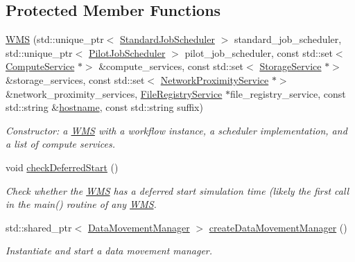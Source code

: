 \subsection*{Protected Member Functions}
\begin{DoxyCompactItemize}
\item 
\hyperlink{classwrench_1_1_w_m_s_a385a87e02d2e6bd7e70624532bca3bdc}{W\+MS} (std\+::unique\+\_\+ptr$<$ \hyperlink{classwrench_1_1_standard_job_scheduler}{Standard\+Job\+Scheduler} $>$ standard\+\_\+job\+\_\+scheduler, std\+::unique\+\_\+ptr$<$ \hyperlink{classwrench_1_1_pilot_job_scheduler}{Pilot\+Job\+Scheduler} $>$ pilot\+\_\+job\+\_\+scheduler, const std\+::set$<$ \hyperlink{classwrench_1_1_compute_service}{Compute\+Service} $\ast$$>$ \&compute\+\_\+services, const std\+::set$<$ \hyperlink{classwrench_1_1_storage_service}{Storage\+Service} $\ast$$>$ \&storage\+\_\+services, const std\+::set$<$ \hyperlink{classwrench_1_1_network_proximity_service}{Network\+Proximity\+Service} $\ast$$>$ \&network\+\_\+proximity\+\_\+services, \hyperlink{classwrench_1_1_file_registry_service}{File\+Registry\+Service} $\ast$file\+\_\+registry\+\_\+service, const std\+::string \&\hyperlink{classwrench_1_1_s4_u___daemon_a52bc0b9a6cd248310749dac086819f00}{hostname}, const std\+::string suffix)
\begin{DoxyCompactList}\small\item\em Constructor\+: a \hyperlink{classwrench_1_1_w_m_s}{W\+MS} with a workflow instance, a scheduler implementation, and a list of compute services. \end{DoxyCompactList}\item 
void \hyperlink{classwrench_1_1_w_m_s_ac264b461c6f5900b96a1c9e33f7f4d58}{check\+Deferred\+Start} ()
\begin{DoxyCompactList}\small\item\em Check whether the \hyperlink{classwrench_1_1_w_m_s}{W\+MS} has a deferred start simulation time (likely the first call in the main() routine of any \hyperlink{classwrench_1_1_w_m_s}{W\+MS}. \end{DoxyCompactList}\item 
std\+::shared\+\_\+ptr$<$ \hyperlink{classwrench_1_1_data_movement_manager}{Data\+Movement\+Manager} $>$ \hyperlink{classwrench_1_1_w_m_s_aaf8902aadfd0542509cd0cae5519bcf3}{create\+Data\+Movement\+Manager} ()
\begin{DoxyCompactList}\small\item\em Instantiate and start a data movement manager. \end{DoxyCompactList}\item 
$$
\end{DoxyCompactItemize}
